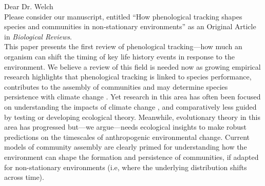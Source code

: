 \documentclass[11pt,a4paper]{article}
\begin{document}
\noindent Dear Dr. Welch
\vspace{1.5ex}\\
Please consider our manuscript, entitled ``How phenological tracking shapes species and communities in non-stationary environments'' as an Original Article in \emph{Biological Reviews}. 
\vspace{1.5ex}\\
This paper presents the first review of phenological tracking---how much an organism can shift the timing of key life history events in response to the environment. We believe a review of this field is needed now as growing empirical research highlights that phenological tracking is linked to species performance, contributes to the assembly of communities and may determine species persistence with climate change \citep[e.g.,][]{Cleland:2012,Zettlemoyer2019}. Yet research in this area has often been focused on understanding the impacts of climate change \citep[e.g.,][]{thackeray2016,cohen2018,kharouba2018}, and comparatively less guided by testing or developing ecological theory. Meanwhile, evolutionary theory in this area has progressed but---we argue---needs ecological insights to make robust predictions on the timescales of anthropogenic environmental change. Current models of community assembly are clearly primed for understanding how the environment can shape the formation and persistence of communities, if adapted for non-stationary environments (i.e, where the underlying distribution shifts across time). %
\vspace{1.5ex}\\
\end{document}

